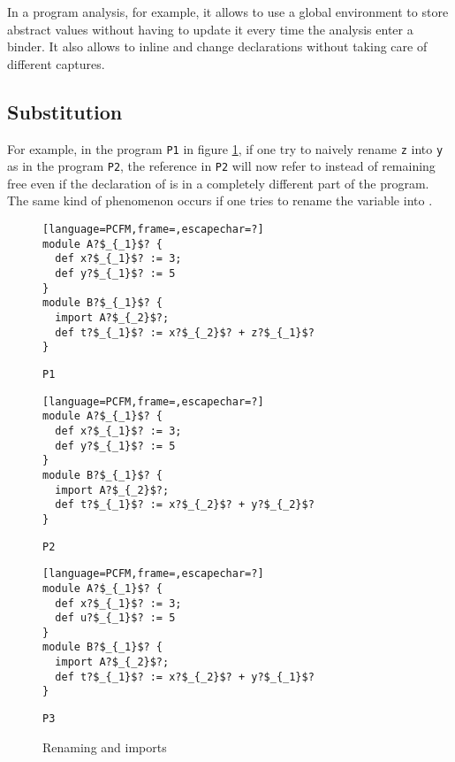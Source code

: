 In a program analysis, for example, it allows to use a global environment to store abstract values without having to update it every time the analysis enter a binder. It also allows to inline and change declarations without taking care of different captures. 



\subsection{Substitution}


For example, in the program {\tt P1} in figure \ref{fig:exrenaming}, if one try to naively rename \lstinline{z} into \lstinline{y} as in the program {\tt P2}, the reference  in {\tt P2} will now refer to  instead of remaining free even if the declaration of  is in a completely different part of the program. The same kind of phenomenon occurs if one tries to rename the variable  into . 
\begin{figure}[h]
  \begin{boxedminipage}{\hsize}
\begin{center}
\begin{minipage}{.28\linewidth}    
\begin{lstlisting}[language=PCFM,frame=,escapechar=?]
module A?$_{_1}$? {
  def x?$_{_1}$? := 3;
  def y?$_{_1}$? := 5
}
module B?$_{_1}$? {
  import A?$_{_2}$?;
  def t?$_{_1}$? := x?$_{_2}$? + z?$_{_1}$?
}
   \end{lstlisting}
\begin{center}
{\tt P1}
\end{center}    \end{minipage}
\hspace{.02\linewidth}\vline\hspace{.02\linewidth}
\begin{minipage}{.28\linewidth}
\begin{lstlisting}[language=PCFM,frame=,escapechar=?]  
module A?$_{_1}$? {
  def x?$_{_1}$? := 3;
  def y?$_{_1}$? := 5
}
module B?$_{_1}$? {
  import A?$_{_2}$?;
  def t?$_{_1}$? := x?$_{_2}$? + y?$_{_2}$?
}
   \end{lstlisting}
\begin{center}
{\tt P2}
\end{center}    \end{minipage}
\hspace{.02\linewidth}\vline\hspace{.02\linewidth}
\begin{minipage}{.28\linewidth}
\begin{lstlisting}[language=PCFM,frame=,escapechar=?]  
module A?$_{_1}$? {
  def x?$_{_1}$? := 3;
  def u?$_{_1}$? := 5
}
module B?$_{_1}$? {
  import A?$_{_2}$?;
  def t?$_{_1}$? := x?$_{_2}$? + y?$_{_1}$?
}
   \end{lstlisting}
\begin{center}
{\tt P3}
\end{center}    \end{minipage}
\end{center}    
  \end{boxedminipage}
  \caption{Renaming and imports}
  \label{fig:exrenaming}
\end{figure}
